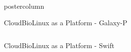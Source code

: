 \documentclass[final]{beamer}
\begin{document}
\begin{frame}
\begin{columns}
\begin{column}{.5\textwidth}
\begin{beamercolorbox}[center,wd=\textwidth]{postercolumn}
\begin{minipage}[T]{.95\textwidth}
{\begin{block}{CloudBioLinux as a Platform - Galaxy-P}
\begin{columns}
              \end{columns}

            \end{block}


            \vfill
            
            \begin{block}{CloudBioLinux as a Platform - Swift}
            \vfill


            \vfill

            \end{block}
          }
        \end{minipage}
      \end{beamercolorbox}
    \end{column}              

  \end{columns}   
\end{frame}
\end{document}
